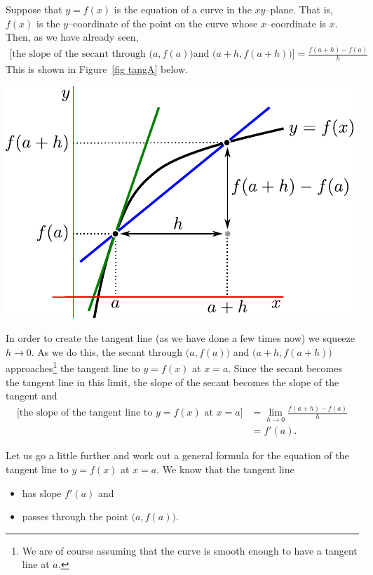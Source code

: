 Suppose that $y=f(x)$ is the equation of a curve in the $xy$--plane.
That is, $f(x)$ is the $y$--coordinate of the point on the curve whose
$x$--coordinate is $x$. Then, as we have already seen,
\begin{align*}
\big[\text{the slope of the secant through $\big(a,f(a)\big)$
       and $\big(a+h,f(a+h)\big)$}\big]
=\frac{f(a+h)-f(a)}{h}
\end{align*}
This is shown in Figure~\ref{fig tangA} below.
\begin{fig}\label{fig tangA}
  \begin{center}
  \includegraphics{extra/tangentA}
  \end{center}
\end{fig}

In order to create the tangent line (as we have done a few times now) we
squeeze $h \to 0$. As we do this, the secant through $\big(a,f(a)\big)$
and $\big(a+h,f(a+h)\big)$ approaches\footnote{We are of course
   assuming that the curve is smooth enough to have a tangent line at $a$.}
the tangent line to $y=f(x)$ at $x=a$. Since the secant becomes the
tangent line in this limit, the slope of the secant becomes the slope
of the tangent and
\begin{align*}
\big[\text{the slope of the tangent line to $y=f(x)$ at $x=a$}\big]
&=\lim_{h\rightarrow 0}\frac{f(a+h)-f(a)}{h} \\
&=f'(a).
\end{align*}


Let us go a little further and work out a general formula for the equation
of the tangent line to $y=f(x)$ at $x=a$. We know that the tangent line
\begin{itemize}
\item
   has slope $f'(a)$ and
\item
   passes through the point $\big(a, f(a)\big)$.
\end{itemize}

